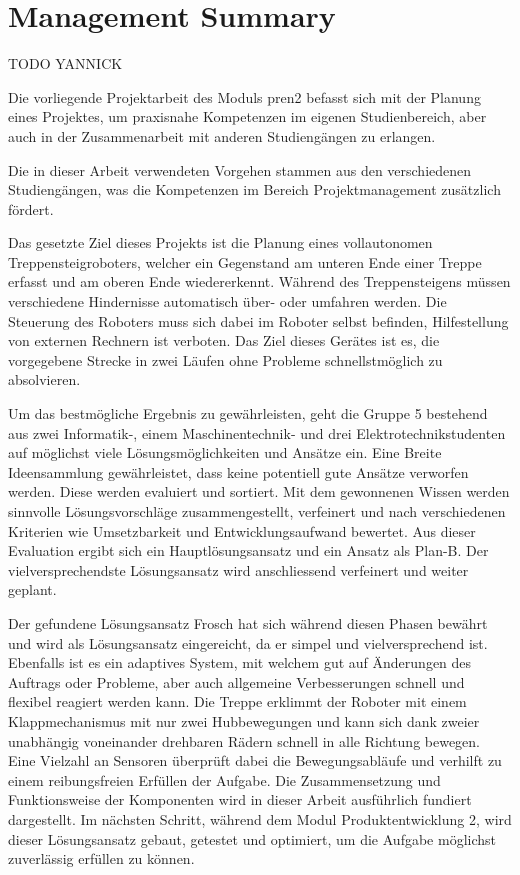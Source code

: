 \newpage
\section*{Management Summary}

TODO YANNICK

Die vorliegende Projektarbeit des Moduls \acrfull{pren2} befasst sich mit der Planung eines Projektes, um praxisnahe Kompetenzen im eigenen Studienbereich, aber auch in der Zusammenarbeit mit anderen Studiengängen zu erlangen.

Die in dieser Arbeit verwendeten Vorgehen stammen aus den verschiedenen Studiengängen, was die Kompetenzen im Bereich Projektmanagement zusätzlich fördert.

Das gesetzte Ziel dieses Projekts ist die Planung eines vollautonomen Treppensteigroboters, welcher ein Gegenstand am unteren Ende einer Treppe erfasst und am oberen Ende wiedererkennt. Während des Treppensteigens müssen verschiedene Hindernisse automatisch über- oder umfahren werden. Die Steuerung des Roboters muss sich dabei im Roboter selbst befinden, Hilfestellung von externen Rechnern ist verboten. Das Ziel dieses Gerätes ist es, die vorgegebene Strecke in zwei Läufen ohne Probleme schnellstmöglich zu absolvieren.

Um das bestmögliche Ergebnis zu gewährleisten, geht die Gruppe 5 bestehend aus zwei Informatik-, einem Maschinentechnik- und drei Elektrotechnikstudenten auf möglichst viele Lösungsmöglichkeiten und Ansätze ein. Eine Breite Ideensammlung gewährleistet, dass keine potentiell gute Ansätze verworfen werden. Diese werden evaluiert und sortiert. Mit dem gewonnenen Wissen werden sinnvolle Lösungsvorschläge zusammengestellt, verfeinert und nach verschiedenen Kriterien wie Umsetzbarkeit und Entwicklungsaufwand bewertet. Aus dieser Evaluation ergibt sich ein Hauptlösungsansatz und ein Ansatz als Plan-B. Der vielversprechendste Lösungsansatz wird anschliessend verfeinert und weiter geplant.

Der gefundene Lösungsansatz \glqq Frosch\grqq{} hat sich während diesen Phasen bewährt und wird als Lösungsansatz eingereicht, da er simpel und vielversprechend ist. Ebenfalls ist es ein adaptives System, mit welchem gut auf Änderungen des Auftrags oder Probleme, aber auch allgemeine Verbesserungen schnell und flexibel reagiert werden kann. Die Treppe erklimmt der Roboter mit einem Klappmechanismus mit nur zwei Hubbewegungen und kann sich dank zweier unabhängig voneinander drehbaren Rädern schnell in alle Richtung bewegen. Eine Vielzahl an Sensoren überprüft dabei die Bewegungsabläufe und verhilft zu einem reibungsfreien Erfüllen der Aufgabe. Die Zusammensetzung und Funktionsweise der Komponenten wird in dieser Arbeit ausführlich fundiert dargestellt.
Im nächsten Schritt, während dem Modul Produktentwicklung 2, wird dieser Lösungsansatz gebaut, getestet und optimiert, um die Aufgabe möglichst zuverlässig erfüllen zu können.
